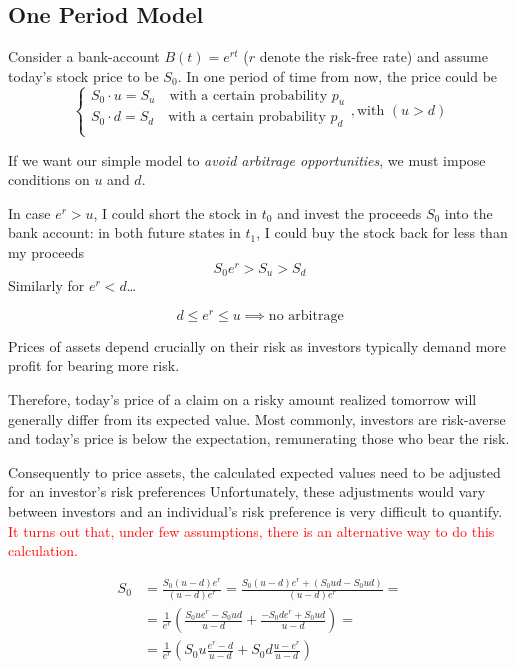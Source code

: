 \documentclass[12pt,a4paper]{article}
\begin{document}
\subsection{One Period Model}
Consider a bank-account $B(t)=e^{rt}$ ($r$ denote the risk-free rate) and assume today's stock price to be $S_0$. In one period of time from now, the price could be 
\begin{equation*}
\begin{cases}
S_0\cdot u = S_u \quad\text{with a certain probability $p_u$} \\
S_0\cdot d = S_d \quad\text{with a certain probability $p_d$}\\ 
\end{cases}, \text{with }(u > d)
\end{equation*}

If we want our simple model to \emph{avoid arbitrage opportunities}, we must impose conditions on $u$ and $d$. 
		
In case $e^r > u$, I could short the stock in $t_0$ and invest the proceeds $S_0$ into the bank account: in both future states in $t_1$, I could buy the stock back for less than my proceeds 
\begin{equation*}
S_0e^r > S_u > S_d
\end{equation*} Similarly for $e^r < d$\ldots

\begin{equation*}
\boxed{d\le e^r \le u \implies \text{no arbitrage}}
\end{equation*}

Prices of assets depend crucially on their risk as investors typically demand more profit for bearing more risk.

Therefore, today's price of a claim on a risky amount realized tomorrow will generally differ from its expected value.
Most commonly, investors are risk-averse and today's price is below the expectation, remunerating those who bear the risk.

Consequently to price assets, the calculated expected values need to be adjusted for an investor's risk preferences
Unfortunately, these adjustments would vary between investors and an individual's risk preference is very difficult to quantify.
\textcolor{red}{It turns out that, under few assumptions, there is an alternative way to do this calculation.}

\begin{equation*}
\begin{aligned}
S_0 &= \frac{S_0(u-d)e^r}{(u-d)e^r} = \frac{S_0(u-d)e^r + (S_0ud - S_0ud)}{(u-d)e^r}=\\
&= \frac{1}{e^r}\left(\frac{S_0ue^r - S_0ud}{u-d} + \frac{-S_0de^r + S_0ud}{u-d}\right)=\\
&= \frac{1}{e^r}\left(S_0u\frac{e^r - d}{u-d} + S_0d\frac{u - e^r}{u-d}\right)
\end{aligned}
\end{equation*}
\end{document}
